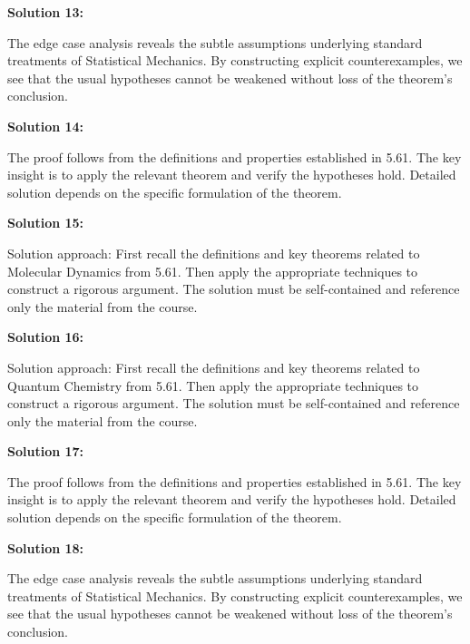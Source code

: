 \documentclass[12pt,a4paper]{exam}
\begin{document}
\vspace{0.5cm}

\textbf{Solution 13:}

The edge case analysis reveals the subtle assumptions underlying standard treatments of Statistical Mechanics. By constructing explicit counterexamples, we see that the usual hypotheses cannot be weakened without loss of the theorem's conclusion.

\vspace{0.5cm}

\textbf{Solution 14:}

The proof follows from the definitions and properties established in 5.61. The key insight is to apply the relevant theorem and verify the hypotheses hold. Detailed solution depends on the specific formulation of the theorem.

\vspace{0.5cm}

\textbf{Solution 15:}

Solution approach: First recall the definitions and key theorems related to Molecular Dynamics from 5.61. Then apply the appropriate techniques to construct a rigorous argument. The solution must be self-contained and reference only the material from the course.

\vspace{0.5cm}

\textbf{Solution 16:}

Solution approach: First recall the definitions and key theorems related to Quantum Chemistry from 5.61. Then apply the appropriate techniques to construct a rigorous argument. The solution must be self-contained and reference only the material from the course.

\vspace{0.5cm}

\textbf{Solution 17:}

The proof follows from the definitions and properties established in 5.61. The key insight is to apply the relevant theorem and verify the hypotheses hold. Detailed solution depends on the specific formulation of the theorem.

\vspace{0.5cm}

\textbf{Solution 18:}

The edge case analysis reveals the subtle assumptions underlying standard treatments of Statistical Mechanics. By constructing explicit counterexamples, we see that the usual hypotheses cannot be weakened without loss of the theorem's conclusion.
\end{document}
